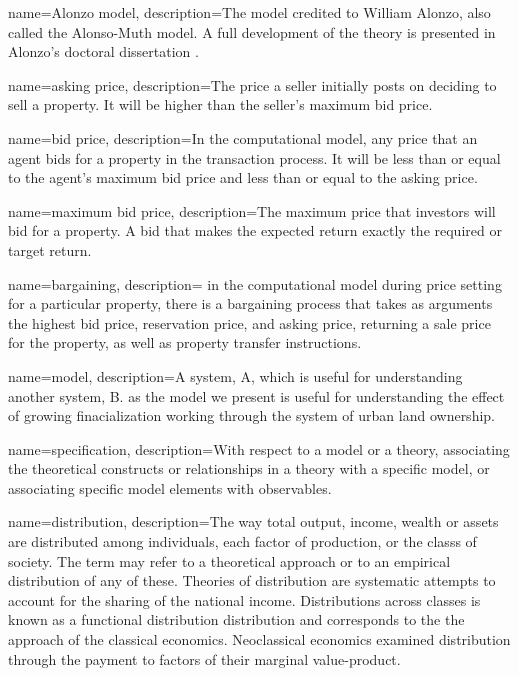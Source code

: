 {
name=Alonzo model,
description={The model credited to William Alonzo, also called the Alonso-Muth model. A full development of the theory is presented in Alonzo's doctoral dissertation \cite{alonzoTheoryUrbanLand1960}.} %
}

{
name=asking price,
description={The price a seller initially posts on deciding to sell a property. It will be higher than the seller's maximum bid price.}
}

{
name=bid price,
description={In the computational model, any price that an agent bids for a property in the transaction process. It will be less than or equal to the agent's maximum bid price and less than or equal to the asking price.}
}

{
name=maximum bid price,
description={The maximum price that investors will bid for a property. A bid that makes the expected return exactly the required or  target return.}
}

{
name=bargaining,
description= {in the computational model during price setting for a particular property, there is a bargaining process that takes as arguments the highest bid price, reservation price, and asking price, returning a sale price for the property, as well as property transfer instructions.}
}


{
name=model,
description={A system, A, which is useful for understanding another system, B. as the model we present is useful for understanding the effect of growing finacialization working through the system of urban land ownership.}
}

{
name=specification,
description={With respect to a model or a theory, associating the theoretical constructs or relationships in a theory with a specific model, or associating specific model elements with observables.}
}

{
name=distribution,
description={The way total \gls{output}, income, \gls{wealth} or assets are distributed among individuals, each \gls{factor of production}, or the \glspl{class} of society. The term may refer to a theoretical approach  or to an empirical distribution of any of these. Theories of distribution are systematic attempts to account for the sharing of the national income.  Distributions across classes is known as a functional distribution distribution and  corresponds to the the approach of the \gls{classical economics}. Neoclassical economics examined distribution through the payment to factors of their \gls{marginal value-product}.}
}

